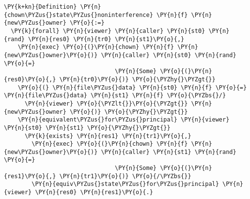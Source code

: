 \begin{BVerbatim}[commandchars=\\\{\},codes={\catcode`\$=3\catcode`\^=7\catcode`\_=8},fontsize=\footnotesize]
\PY{k+kn}{Definition} \PY{n}{chown\PYZus{}state\PYZus{}noninterference} \PY{n}{f} \PY{n}{new\PYZus{}owner} \PY{o}{:=}
  \PY{k}{forall} \PY{n}{viewer} \PY{n}{caller} \PY{n}{st0} \PY{n}{rand} \PY{n}{res0} \PY{n}{tr0} \PY{n}{st1}\PY{o}{,}
    \PY{n}{exec} \PY{o}{(}\PY{n}{chown} \PY{n}{f} \PY{n}{new\PYZus{}owner}\PY{o}{)} \PY{n}{caller} \PY{n}{st0} \PY{n}{rand} \PY{o}{=}
                                \PY{n}{Some} \PY{o}{(}\PY{n}{res0}\PY{o}{,} \PY{n}{tr0}\PY{o}{)} \PY{o}{\PYZhy{}\PYZgt{}}
    \PY{o}{(} \PY{n}{file\PYZus{}data} \PY{n}{st0} \PY{n}{f} \PY{o}{=} \PY{n}{file\PYZus{}data} \PY{n}{st1} \PY{n}{f} \PY{o}{\PYZbs{}/}
      \PY{n}{viewer} \PY{o}{\PYZlt{}}\PY{o}{\PYZgt{}} \PY{n}{new\PYZus{}owner} \PY{o}{)} \PY{o}{\PYZhy{}\PYZgt{}}
    \PY{n}{equivalent\PYZus{}for\PYZus{}principal} \PY{n}{viewer} \PY{n}{st0} \PY{n}{st1} \PY{o}{\PYZhy{}\PYZgt{}}
      \PY{k}{exists} \PY{n}{res1} \PY{n}{tr1}\PY{o}{,}
        \PY{n}{exec} \PY{o}{(}\PY{n}{chown} \PY{n}{f} \PY{n}{new\PYZus{}owner}\PY{o}{)} \PY{n}{caller} \PY{n}{st1} \PY{n}{rand} \PY{o}{=}
                                \PY{n}{Some} \PY{o}{(}\PY{n}{res1}\PY{o}{,} \PY{n}{tr1}\PY{o}{)} \PY{o}{/\PYZbs{}}
        \PY{n}{equiv\PYZus{}state\PYZus{}for\PYZus{}principal} \PY{n}{viewer} \PY{n}{res0} \PY{n}{res1}\PY{o}{.}
\end{BVerbatim}
